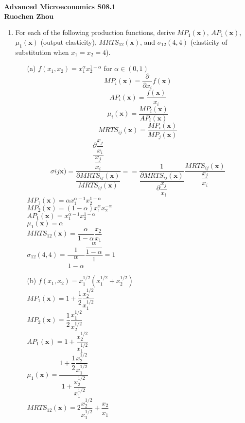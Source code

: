 \documentclass[11pt]{article}
\begin{document}
\begin{center}
\textbf{Advanced Microeconomics S08.1\\}
\textbf{Ruochen Zhou}
\end{center}

\medskip
\begin{enumerate}
\item For each of the following production functions, derive $MP_{1}(\mathbf{x})$, $AP_{1}(\mathbf{x})$, $\mu_{1}(\mathbf{x})$ (output elasticity), $MRTS_{12}(\mathbf{x})$, and $\sigma_{12}(4,4)$ (elasticity of substitution when $x_{1}=x_{2}=4$).
	\begin{itemize}
	\item[(a)] $f(x_{1},x_{2})=x_{1}^{\alpha}x_{2}^{1-\alpha}$ for $\alpha\in(0,1)$
	\medskip\\
	$$MP_i(\textbf{x})=\dfrac{\partial}{\partial x_i}f(\textbf{x})$$
	$$AP_i(\textbf{x})=\dfrac{f(\textbf{x})}{x_i}$$
	$$\mu_i(\textbf{x})=\dfrac{MP_i(\textbf{x})}{AP_i(\textbf{x})}$$
	$$MRTS_{ij}(\textbf{x})=\dfrac{MP_i(\textbf{x})}{MP_j(\textbf{x})}$$
	$$\sigma{ij}\textbf{x})=\dfrac{\dfrac{\partial\dfrac{x_j}{x_i}}{\dfrac{x_j}{x_i}}}{\dfrac{\partial MRTS_{ij}(\textbf{x})}{MRTS_{ij}(\textbf{x})}}==\dfrac{1}{\dfrac{\partial MRTS_{ij}(\textbf{x})}{\partial\dfrac{x_j}{x_i} }}\dfrac{MRTS_{ij}(\textbf{x})}{\dfrac{x_j}{x_i}}$$
	$MP_1(\textbf{x})=\alpha x_1^{\alpha-1}x_2^{1-\alpha}$\\
	$MP_2(\textbf{x})=(1-\alpha)x_1^{\alpha}x_2^{-\alpha}$\\
	$AP_1(\textbf{x})=x_1^{\alpha-1}x_2^{1-\alpha}$\\
	$\mu_1(\textbf{x})=\alpha$\\
	$MRTS_{12}(\textbf{x})=\dfrac{\alpha}{1-\alpha}\dfrac{x_2}{x_1}$\\
	$\sigma_{12}(4,4)=\dfrac{1}{\dfrac{\alpha}{1-\alpha}}\dfrac{\dfrac{\alpha}{1-\alpha}}{1}=1$\\
	\item[(b)] $f(x_{1},x_{2})=x_{1}^{1/2}(x_{1}^{1/2}+x_{2}^{1/2})$
	\medskip\\
	$MP_1(\textbf{x})=1+\dfrac{1}{2}\dfrac{x_2^{1/2}}{x_1^{1/2}}$\\
	$MP_2(\textbf{x})=\dfrac{1}{2}\dfrac{x_1^{1/2}}{x_2^{1/2}}$\\
	$AP_1(\textbf{x})=1+\dfrac{x_2^{1/2}}{x_1^{1/2}}$\\
	$\mu_1(\textbf{x})=\dfrac{1+\dfrac{1}{2}\dfrac{x_2^{1/2}}{x_1^{1/2}}}{1+\dfrac{x_2^{1/2}}{x_1^{1/2}}}$\\
	$MRTS_{12}(\textbf{x})=2\dfrac{x_2^{1/2}}{x_1^{1/2}}+\dfrac{x_2}{x_1}$\\

\end{itemize}
\end{enumerate}
\end{document}
